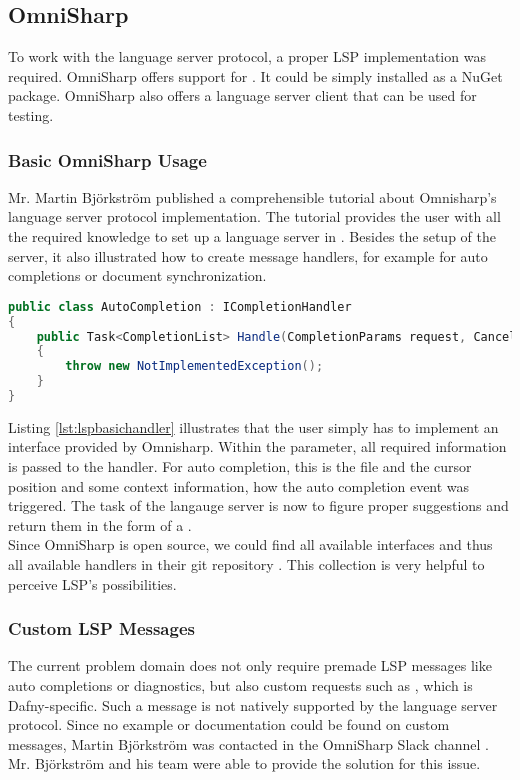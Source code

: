 \subsection{OmniSharp}
\label{section:analysis:omnisharp}
To work with the language server protocol, a proper LSP implementation was required. OmniSharp offers support for \Csharp \cite{langserverdotorg}. It could be simply installed as a NuGet package. OmniSharp also offers a language server client that can be used for testing.

\subsubsection{Basic OmniSharp Usage}
Mr. Martin Björkström published a comprehensible tutorial about Omnisharp's language server protocol implementation. The tutorial provides the user with all the required knowledge to set up a language server in \Csharp. Besides the setup of the server, it also illustrated how to create message handlers, for example for auto completions or document synchronization.

\begin{lstlisting}[language=csharp, caption={LSP Handler Implementation}, captionpos=b, label={lst:lspbasichandler}]
public class AutoCompletion : ICompletionHandler
{
    public Task<CompletionList> Handle(CompletionParams request, CancellationToken cancellationToken)
    {
        throw new NotImplementedException();
    }
}
\end{lstlisting}

Listing \ref{lst:lspbasichandler} illustrates that the user simply has to implement an interface provided by Omnisharp. Within the  parameter, all required information is passed to the handler. For auto completion, this is the file and the cursor position and some context information, how the auto completion event was triggered. The task of the langauge server is now to figure proper suggestions and return them in the form of a .\\

Since OmniSharp is open source, we could find all available interfaces and thus all available handlers in their git repository \cite{omnisharpgit}. This collection is very helpful to perceive LSP's possibilities.

\subsubsection{Custom LSP Messages}
\label{chapter:customlspmsg}
The current problem domain does not only require premade LSP messages like auto completions or diagnostics, but also custom requests such as , which is Dafny-specific. Such a message is not natively supported by the language server protocol. Since no example or documentation could be found on custom messages, Martin Bj\"orkstr\"om was contacted in the OmniSharp Slack channel \cite{omnisharpslack}. Mr. Bj\"orkstr\"om and his team were able to provide the solution for this issue.\\

